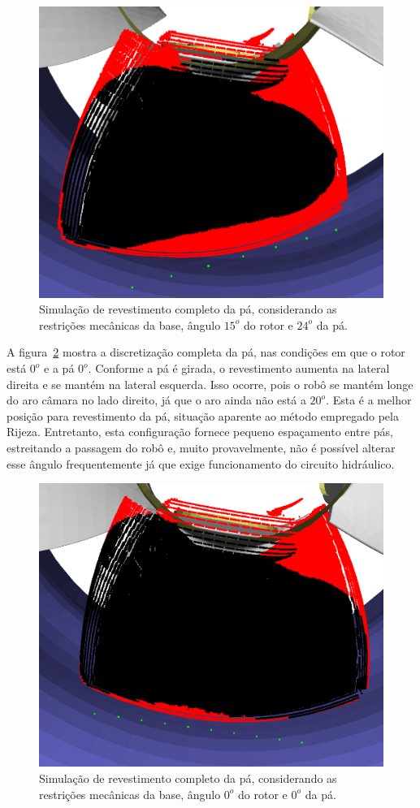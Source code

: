 \begin{figure}[!ht]
	\centering	
	\includegraphics[width=0.7\columnwidth]{method/figs/simcomp1_2.png}
	\caption{Simulação de revestimento completo da pá, considerando as
	restrições mecânicas da base, ângulo $15^o$ do rotor e $24^o$ da pá.}
	\label{fig::simcomp1_2}
\end{figure}

A figura~\ref{fig::simcomp1_4} mostra a discretização completa da pá, nas
condições em que o rotor está $0^o$ e a pá $0^o$. Conforme a pá é girada, o
revestimento aumenta na lateral direita e se mantém na lateral esquerda. Isso
ocorre, pois o robô se mantém longe do aro câmara no lado direito, já que o aro
ainda não está a $20^o$. Esta é a melhor posição para revestimento da pá,
situação aparente ao método empregado pela Rijeza. Entretanto, esta configuração
fornece pequeno espaçamento entre pás, estreitando a passagem do robô e, muito
provavelmente, não é possível alterar esse ângulo frequentemente já que exige
funcionamento do circuito hidráulico.

\begin{figure}[!ht]
	\centering	
	\includegraphics[width=0.7\columnwidth]{method/figs/simcomp1_4.png}
	\caption{Simulação de revestimento completo da pá, considerando as
	restrições mecânicas da base, ângulo $0^o$ do rotor e $0^o$ da pá.}
	\label{fig::simcomp1_4}
\end{figure}

